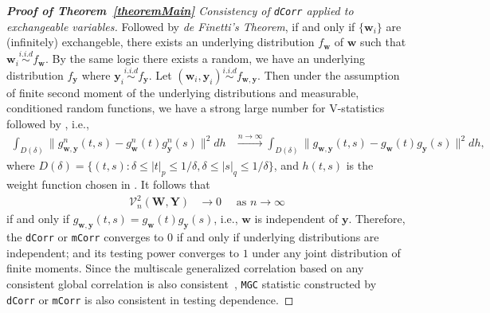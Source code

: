 \documentclass[11pt]{article}
\theoremstyle{definition}
\begin{document}
\begin{proof}[\textbf{Proof of Theorem~\ref{theoremMain}} Consistency of \texttt{dCorr} applied to exchangeable variables]
Followed by \textit{de Finetti's Theorem}, if and only if $\{ \mathbf{w}_{i} \}$ are (infinitely) exchangeble, there exists an underlying distribution $f_{\mathbf{w}}$ of $\mathbf{w}$ such that $\mathbf{w}_{i}  \overset{i.i.d}{\sim} f_{\mathbf{w}} $. By the same logic there exists a random, we have an underlying distribution $f_{\mathbf{y}}$ where $\mathbf{y}_{i} \overset{i.i.d}{\sim} f_{\mathbf{y}}$. Let $(\mathbf{w}_{i}, \mathbf{y}_{i}) \overset{i.i.d}{\sim}   f_{\mathbf{w}, \mathbf{y}}$. Then under the assumption of finite second moment of the underlying distributions and measurable, conditioned random functions, we have a strong large number for V-statistics followed by \cite{szekely2007measuring}, i.e., 
\begin{eqnarray}
\displaystyle\int_{D(\delta)}{\|g_{\mathbf{w},\mathbf{y}}^{n}(t,s)-g_{\mathbf{w}}^{n}(t)g_{\mathbf{y}}^{n}(s)\|^{2}}dh &\stackrel{n \rightarrow \infty}{\longrightarrow} 
\displaystyle\int_{D(\delta)}{\|g_{\mathbf{w},\mathbf{y}}(t,s)-g_{\mathbf{w}}(t)g_{\mathbf{y}}(s)\|^{2}}dh,
\label{eq:SLLN}
\end{eqnarray}
where $D(\delta)=\{(t,s):\delta \leq |t|_{p} \leq 1/\delta,\delta \leq |s|_{q} \leq 1/\delta\}$, and $h(t,s)$ is the weight function chosen in \cite{szekely2007measuring}. 	
It follows that 
\begin{eqnarray}
\mathcal{V}_{n}^{2}(\mathbf{W},\mathbf{Y}) &\rightarrow 0 \quad \mbox{ as } n \rightarrow \infty
\label{eq:conv2}
\end{eqnarray}
if and only if $g_{\mathbf{w},\mathbf{y}}(t,s) = g_{\mathbf{w}}(t) g_{\mathbf{y}}(s)$, i.e., $\mathbf{w}$ is independent of $\mathbf{y}$. Therefore, the \texttt{dCorr} or \texttt{mCorr} converges to $0$ if and only if  underlying distributions are independent; and its testing power converges to $1$ under any joint distribution of finite moments. Since the multiscale generalized correlation based on any consistent global correlation is also consistent~\citep{shen2016discovering}, \texttt{MGC} statistic constructed by \texttt{dCorr} or \texttt{mCorr} is also consistent in testing dependence.
\end{proof}
\end{document}
